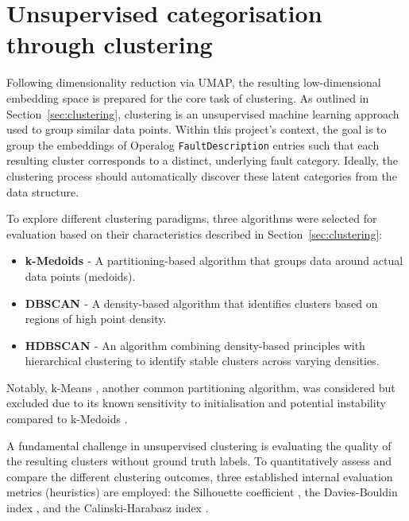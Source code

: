 \documentclass[10pt,oneside]{report}
\begin{document}
\section{Unsupervised categorisation through clustering}\label{sec:unsupcat}

Following dimensionality reduction via UMAP, the resulting low-dimensional embedding space is prepared for the core task of clustering. As outlined in Section~\ref{sec:clustering}, clustering is an unsupervised machine learning approach used to group similar data points. Within this project's context, the goal is to group the embeddings of Operalog \texttt{FaultDescription} entries such that each resulting cluster corresponds to a distinct, underlying fault category. Ideally, the clustering process should automatically discover these latent categories from the data structure.

To explore different clustering paradigms, three algorithms were selected for evaluation based on their characteristics described in Section~\ref{sec:clustering}:

\begin{itemize}
    \item \textbf{k-Medoids \cite{kmedoids}} - A partitioning-based algorithm that groups data around actual data points (medoids).
    \item \textbf{DBSCAN \cite{ester1996density}} - A density-based algorithm that identifies clusters based on regions of high point density.
    \item \textbf{HDBSCAN \cite{campello2013density}} - An algorithm combining density-based principles with hierarchical clustering to identify stable clusters across varying densities.
\end{itemize}

Notably, k-Means \cite{macqueen1967some}, another common partitioning algorithm, was considered but excluded due to its known sensitivity to initialisation and potential instability compared to k-Medoids \cite{zhang2008improved}.

A fundamental challenge in unsupervised clustering is evaluating the quality of the resulting clusters without ground truth labels. To quantitatively assess and compare the different clustering outcomes, three established internal evaluation metrics (heuristics) are employed: the Silhouette coefficient \cite{rousseeuw1987silhouettes}, the Davies-Bouldin index \cite{davies1979cluster}, and the Calinski-Harabasz index \cite{calinski1974dendrite}.
\end{document}
